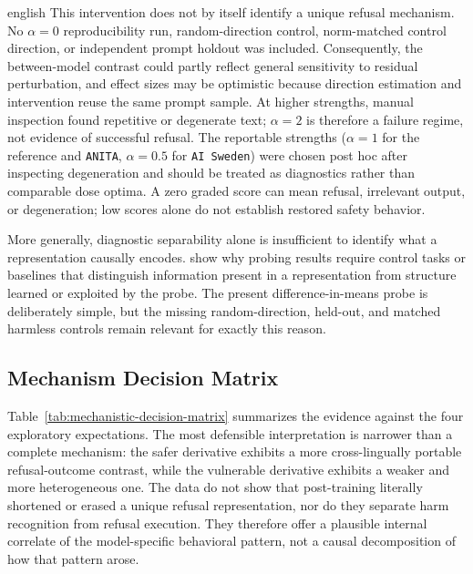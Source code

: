 \begin{otherlanguage*}{english}
This intervention does not by itself identify a unique refusal mechanism. No $\alpha=0$ reproducibility run, random-direction control, norm-matched control direction, or independent prompt holdout was included. Consequently, the between-model contrast could partly reflect general sensitivity to residual perturbation, and effect sizes may be optimistic because direction estimation and intervention reuse the same prompt sample. At higher strengths, manual inspection found repetitive or degenerate text; $\alpha=2$ is therefore a failure regime, not evidence of successful refusal. The reportable strengths ($\alpha=1$ for the reference and \texttt{ANITA}, $\alpha=0.5$ for \texttt{AI Sweden}) were chosen post hoc after inspecting degeneration and should be treated as diagnostics rather than comparable dose optima. A zero graded score can mean refusal, irrelevant output, or degeneration; low scores alone do not establish restored safety behavior.

More generally, diagnostic separability alone is insufficient to identify what a representation causally encodes. \textcite{hewittDesigningInterpretingProbes2019} show why probing results require control tasks or baselines that distinguish information present in a representation from structure learned or exploited by the probe. The present difference-in-means probe is deliberately simple, but the missing random-direction, held-out, and matched harmless controls remain relevant for exactly this reason.

\subsection{Mechanism Decision Matrix}
\label{sec:mechanism-decision-matrix}

Table~\ref{tab:mechanistic-decision-matrix} summarizes the evidence against the four exploratory expectations. The most defensible interpretation is narrower than a complete mechanism: the safer derivative exhibits a more cross-lingually portable refusal-outcome contrast, while the vulnerable derivative exhibits a weaker and more heterogeneous one. The data do not show that post-training literally shortened or erased a unique refusal representation, nor do they separate harm recognition from refusal execution. They therefore offer a plausible internal correlate of the model-specific behavioral pattern, not a causal decomposition of how that pattern arose.


\end{otherlanguage*}
